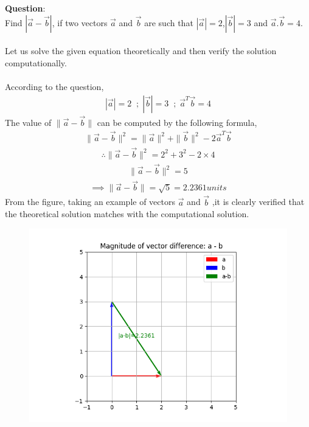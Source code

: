 \documentclass[journal]{IEEEtran}
\begin{document}
\textbf{Question}:\\
    Find $|\vec{a}-\vec{b}|$, if two vectors $\vec{a}$ and $\vec{b}$ are such that $|\vec{a}|=2$,$|\vec{b}|=3$ and $\vec{a}.\vec{b}=4$.\\ 
\solution \\
Let us solve the given equation theoretically and then verify the solution computationally.\\
\\
According to the question,\\
\begin{align}
    |\vec{a}|=2 \;\; ; \; |\vec{b}|=3 \;\; ;\; \vec{a}^T\vec{b}=4
\end{align}
The  value of $\|\vec{a}-\vec{b}\|$ can be computed by the following formula,
\begin{align}
    \|\vec{a}-\vec{b}\|^2=\|\vec{a}\|^2+\|\vec{b}\|^2-2\vec{a}^T\vec{b}
\end{align}
\begin{align}
    \therefore \|\vec{a}-\vec{b}\|^2=2^2+3^2-2\times4
\end{align}
\begin{align}
    \|\vec{a}-\vec{b}\|^2=5
\end{align}
\begin{align}
    \implies \|\vec{a}-\vec{b}\|=\sqrt{5}=2.2361 units
\end{align}
From the figure, taking an example of vectors $\vec{a}$ and $\vec{b}$ ,it is clearly verified that the theoretical solution matches with the computational solution.\\
\begin{figure}[H]
    \centering
    \includegraphics[width=0.6\columnwidth]{figs/Figure_1.png}
    \label{fig-1}
\end{figure}



 
\end{document}
